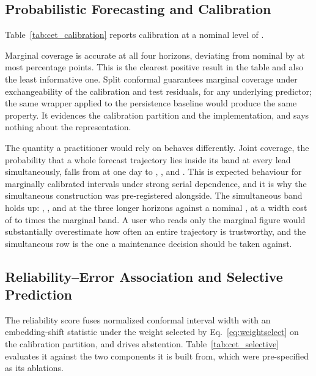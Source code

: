\subsection{Probabilistic Forecasting and Calibration}
\label{sec:results_calibration}

Table~\ref{tab:cet_calibration} reports calibration at a nominal level of \nominalCoverage{}.


Marginal coverage is accurate at all four horizons, deviating from nominal by at most \maxCoverageDeviation{} percentage points. This is the clearest positive result in the table and also the least informative one. Split conformal guarantees marginal coverage under exchangeability of the calibration and test residuals, for any underlying predictor; the same wrapper applied to the persistence baseline would produce the same property. It evidences the calibration partition and the implementation, and says nothing about the representation.

The quantity a practitioner would rely on behaves differently. Joint coverage, the probability that a whole forecast trajectory lies inside its band at every lead simultaneously, falls from \jointCoverageOne{} at one day to \jointCoverageSeven{}, \jointCoverageThirty{}, and \jointCoverageNinety{}. This is expected behaviour for marginally calibrated intervals under strong serial dependence, and it is why the simultaneous construction was pre-registered alongside. The simultaneous band holds up: \simulCoverageSeven{}, \simulCoverageThirty{}, and \simulCoverageNinety{} at the three longer horizons against a nominal \nominalCoverage{}, at a width cost of \widthRatioSeven{} to \widthRatioNinety{} times the marginal band. A user who reads only the marginal figure would substantially overestimate how often an entire trajectory is trustworthy, and the simultaneous row is the one a maintenance decision should be taken against.

\subsection{Reliability--Error Association and Selective Prediction}
\label{sec:results_selective}

The reliability score fuses normalized conformal interval width with an embedding-shift statistic under the weight selected by Eq.~\eqref{eq:weightselect} on the calibration partition, and drives abstention. Table~\ref{tab:cet_selective} evaluates it against the two components it is built from, which were pre-specified as its ablations.

